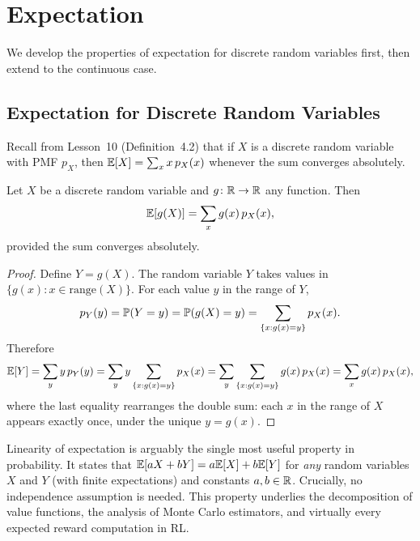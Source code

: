\documentclass[11pt,a4paper]{article}
\begin{document}

\section{Expectation}
\label{sec:expectation}

We develop the properties of expectation for discrete random variables
first, then extend to the continuous case.

\subsection{Expectation for Discrete Random Variables}

Recall from Lesson~10 (Definition~4.2) that if $X$ is a discrete random
variable with PMF $p_X$, then $\mathbb{E}[X] = \sum_x x\,p_X(x)$ whenever the
sum converges absolutely.

\begin{theorem}
\label{thm:lotus_discrete}
Let $X$ be a discrete random variable and $g \colon \mathbb{R} \to \mathbb{R}$ any
function. Then
\[
    \mathbb{E}[g(X)] = \sum_x g(x) \, p_X(x),
\]
provided the sum converges absolutely.
\end{theorem}

\begin{proof}
Define $Y = g(X)$. The random variable $Y$ takes values in
$\{g(x) : x \in \mathrm{range}(X)\}$. For each value $y$ in the range
of $Y$,
\[
    p_Y(y) = \mathbb{P}(Y = y) = \mathbb{P}(g(X) = y)
    = \sum_{\{x : g(x) = y\}} p_X(x).
\]
Therefore
\[
    \mathbb{E}[Y] = \sum_y y \, p_Y(y)
    = \sum_y y \sum_{\{x : g(x) = y\}} p_X(x)
    = \sum_y \sum_{\{x : g(x) = y\}} g(x) \, p_X(x)
    = \sum_x g(x) \, p_X(x),
\]
where the last equality rearranges the double sum: each $x$ in the range
of $X$ appears exactly once, under the unique $y = g(x)$.
\end{proof}

\begin{keyresult}[title={Linearity of Expectation}]
Linearity of expectation is arguably the single most useful property
in probability. It states that $\mathbb{E}[aX + bY] = a\mathbb{E}[X] + b\mathbb{E}[Y]$ for
\emph{any} random variables $X$ and $Y$ (with finite expectations) and
constants $a, b \in \mathbb{R}$. Crucially, no independence assumption is
needed. This property underlies the decomposition of value functions,
the analysis of Monte Carlo estimators, and virtually every expected
reward computation in RL.
\end{keyresult}
\end{document}
